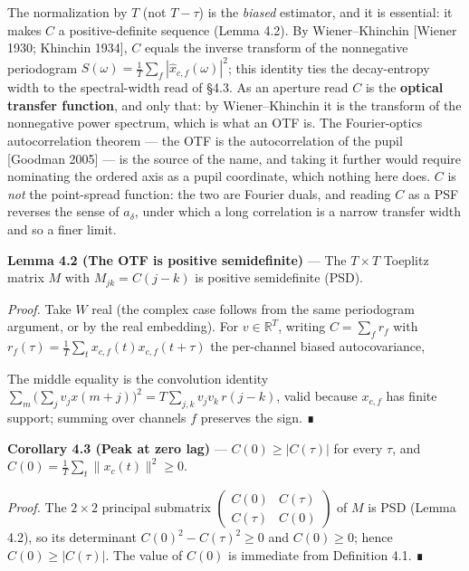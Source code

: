 \documentclass[10pt,letterpaper,twocolumn]{article}
\begin{document}
The normalization by \(T\) (not \(T-\tau\)) is the \emph{biased} estimator, and it is essential: it makes \(C\) a positive-definite sequence (Lemma 4.2). By Wiener--Khinchin {[}Wiener 1930; Khinchin 1934{]}, \(C\) equals the inverse transform of the nonnegative periodogram \(S(\omega)=\tfrac1T\sum_f|\hat x_{c,f}(\omega)|^2\); this identity ties the decay-entropy width to the spectral-width read of §4.3. As an aperture read \(C\) is the \textbf{optical transfer function}, and only that: by Wiener--Khinchin it is the transform of the nonnegative power spectrum, which is what an OTF is. The Fourier-optics autocorrelation theorem --- the OTF is the autocorrelation of the pupil {[}Goodman 2005{]} --- is the source of the name, and taking it further would require nominating the ordered axis as a pupil coordinate, which nothing here does. \(C\) is \emph{not} the point-spread function: the two are Fourier duals, and reading \(C\) as a PSF reverses the sense of \(a_\delta\), under which a long correlation is a narrow transfer width and so a finer limit.

\textbf{Lemma 4.2 (The OTF is positive semidefinite)} --- The \(T\times T\) Toeplitz matrix \(M\) with \(M_{jk}=C(j-k)\) is positive semidefinite (PSD).

\emph{Proof.} Take \(W\) real (the complex case follows from the same periodogram argument, or by the real embedding). For \(v\in\mathbb{R}^T\), writing \(C=\sum_f r_f\) with \(r_f(\tau)=\tfrac1T\sum_t x_{c,f}(t)x_{c,f}(t+\tau)\) the per-channel biased autocovariance,


The middle equality is the convolution identity \(\sum_m\big(\sum_j v_j x(m+j)\big)^2=T\sum_{j,k}v_jv_k\,r(j-k)\), valid because \(x_{c,f}\) has finite support; summing over channels \(f\) preserves the sign. ∎

\textbf{Corollary 4.3 (Peak at zero lag)} --- \(C(0)\ge|C(\tau)|\) for every \(\tau\), and \(C(0)=\tfrac1T\sum_t\|x_c(t)\|^2\ge 0\).

\emph{Proof.} The \(2\times2\) principal submatrix \(\left(\begin{smallmatrix}C(0)&C(\tau)\\ C(\tau)&C(0)\end{smallmatrix}\right)\) of \(M\) is PSD (Lemma 4.2), so its determinant \(C(0)^2-C(\tau)^2\ge0\) and \(C(0)\ge0\); hence \(C(0)\ge|C(\tau)|\). The value of \(C(0)\) is immediate from Definition 4.1. ∎
\end{document}

